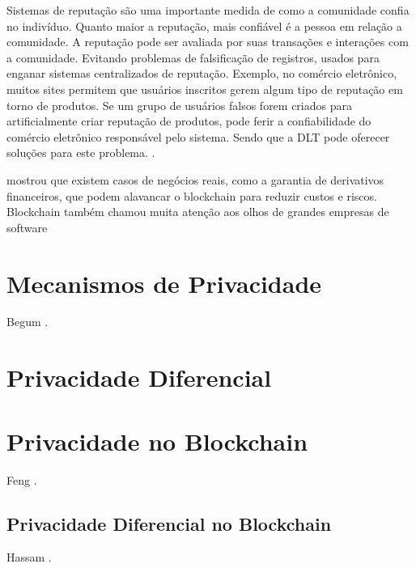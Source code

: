 Sistemas de reputação são uma importante medida de como a comunidade confia no indivíduo. Quanto maior a reputação, mais confiável é a pessoa em relação a comunidade. A reputação pode ser avaliada por suas transações e interações com a comunidade. Evitando problemas de falsificação de registros, usados para enganar sistemas centralizados de reputação. Exemplo, no comércio eletrônico, muitos sites permitem que usuários inscritos gerem algum tipo de reputação em torno de produtos. Se um grupo de usuários falsos forem criados para artificialmente criar reputação de produtos, pode ferir a confiabilidade do comércio eletrônico responsável pelo sistema. Sendo que a DLT pode oferecer soluções para este problema. \citep{zheng2018blockchain}.




mostrou que existem casos de negócios reais, como a garantia de derivativos financeiros, que podem alavancar o blockchain para reduzir custos e riscos. Blockchain também chamou muita atenção aos olhos de grandes empresas de software

\chapter{Mecanismos de Privacidade}
Begum \cite{article:BegumSNausheenF2018}.

\chapter{Privacidade Diferencial}
\label{cap:privacidadediferencial}

\chapter{Privacidade no Blockchain}
\label{cap:blockchain}
Feng \cite{Feng2019}.

\section{Privacidade Diferencial no Blockchain}
Hassam \cite{Hassan2020}. %

